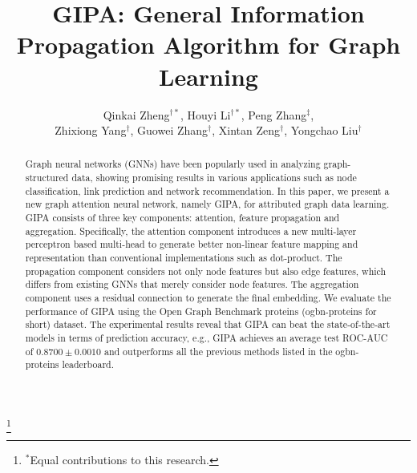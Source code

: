 \documentclass[sigconf]{acmart}
\newcommand{\model}{GIPA\xspace}
\begin{document}
\title{GIPA: General Information Propagation Algorithm for Graph Learning}



\author{Qinkai Zheng$^{\dagger*}$, Houyi Li$^{\dagger*}$, Peng Zhang$^\ddagger$,\\Zhixiong Yang$^\dagger$, Guowei Zhang$^\dagger$, Xintan Zeng$^\dagger$, Yongchao Liu$^\dagger$}
\thanks{$^*$Equal contributions to this research.}
















\renewcommand{\shortauthors}{Zheng and Li, et al.}


\begin{abstract}
Graph neural networks (GNNs) have been popularly used in analyzing graph-structured data,  showing promising results in various applications such as node classification, link prediction and network recommendation. 
In this paper, we present a new graph attention neural network, namely \model, for attributed graph data learning.
\model consists of three key components: attention, feature propagation and aggregation.
Specifically, the attention component introduces a new  multi-layer perceptron based multi-head to generate better  non-linear feature mapping and representation than conventional implementations such as dot-product. 
The propagation component considers not only node features but also edge features, which differs from existing GNNs that merely consider node features.
The aggregation component uses a residual connection to generate the final embedding.
We evaluate the performance of \model using the Open Graph Benchmark proteins (ogbn-proteins for short) dataset.
The experimental results reveal that \model can beat the  state-of-the-art models in terms of prediction accuracy, e.g., \model achieves an average test ROC-AUC of $0.8700\pm 0.0010$ and outperforms all the previous methods listed in the ogbn-proteins leaderboard.
\end{abstract}
\end{document}

